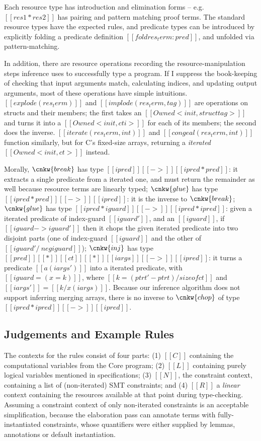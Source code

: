 \documentclass[11pt]{article}%
\begin{document}
Each resource type has introduction and elimination forms -- e.g.
$[[ res1 * res2 ]]$ has pairing and pattern matching proof terms. The
standard resource types have the expected rules, and predicate types
can be introduced by explicitly folding a predicate definition
$[[ fold res_term : pred ]]$, and unfolded via pattern-matching.


In addition, there are resource operations recording the
resource-manipulation steps inference uses to successfully type a
program.  If I suppress the book-keeping of checking that input
arguments match, calculating indices, and updating output arguments,
most of these operations have simple intuitions.
%
$[[ explode ( res_term ) ]]$ and $[[ implode ( res_term , tag ) ]]$
are operations on structs and their members; the first takes an
$[[ Owned < init , struct tag > ]]$ and turns it into a
$[[ Owned < init , cti > ]]$ for each of its members; the second does the
inverse.  $[[ iterate ( res_term , int ) ]]$ and
$[[ congeal ( res_term , int ) ]]$ function similarly, but for C's
fixed-size arrays, returning a \emph{iterated} $[[ Owned < init , ct > ]]$
instead.

Morally,
$\cnkw{break}$ has type $[[ ipred ]] [[ -> ]] [[ ipred * pred ]]$: it
extracts a single predicate from a iterated one, and must return the
remainder as well because resource terms are linearly typed;
$\cnkw{glue}$ has type $[[ ipred * pred ]] [[ -> ]] [[ ipred ]]$: it
is the inverse to $\cnkw{break}$; $\cnkw{glue}$ has type
$[[ ipred * iguard ]] [[ -> ]] [[ ipred * ipred ]]$: given a
iterated predicate of index-guard $[[ iguard' ]]$, and an
$[[ iguard ]]$, if $[[ iguard -> iguard' ]]$ then it chops the given
iterated predicate into two disjoint parts (one of index-guard
$[[ iguard ]]$ and the other of $[[ iguard' /\ neg iguard ]]$);
$\cnkw{inj}$ has type
$[[ pred ]] [[ * ]] [[ ct ]] [[ * ]] [[ iargs ]] [[ -> ]] [[ ipred ]]$:
it turns a predicate $[[ a ( iargs' ) ]]$ into a iterated
predicate, with $[[ iguard = ( x = k ) ]]$, where
$[[ k = ( ptrt' - ptrt ) / sizeof ct ]]$ and
$[[ iargs' ]] = [[ k / x ( iargs ) ]]$. Because our inference
algorithm does not support inferring merging
arrays, there is no inverse to
$\cnkw{chop}$ of type $[[ ipred * ipred ]] [[ -> ]] [[ ipred ]]$.

\subsection{Judgements and Example Rules}\label{subsec:judgm_eg_rules}

The contexts for the rules consist of four parts: (1) $[[ C ]]$ containing the
computational variables from the Core program; (2) $[[ L ]]$ containing purely
logical variables mentioned in specifications; (3) $[[ N ]]$, the constraint
context, containing a list of (non-iterated) SMT constraints; and (4) $[[ R ]]$ a
\emph{linear} context containing the resources available at that point during
type-checking. Assuming a constraint context of only non-iterated constraints
is an acceptable simplification, because the elaboration pass can annotate terms
with fully-instantiated constraints, whose quantifiers were either supplied
by lemmas, annotations or default instantiation.
\end{document}
